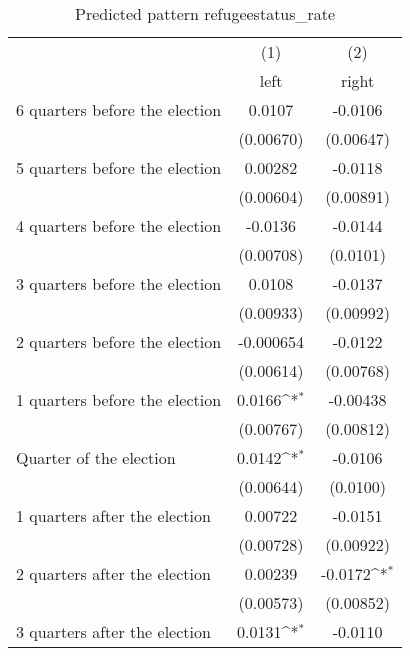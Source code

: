 \begin{table}[htbp]\centering
\def\sym#1{\ifmmode^{#1}\else\(^{#1}\)\fi}
\caption{Predicted pattern refugeestatus\_rate}
\begin{tabular}{l*{2}{c}}
\hline\hline
                    &\multicolumn{1}{c}{(1)}&\multicolumn{1}{c}{(2)}\\
                    &\multicolumn{1}{c}{left}&\multicolumn{1}{c}{right}\\
\hline
 6 quarters before the election&      0.0107         &     -0.0106         \\
                    &   (0.00670)         &   (0.00647)         \\
[1em]
 5 quarters before the election&     0.00282         &     -0.0118         \\
                    &   (0.00604)         &   (0.00891)         \\
[1em]
 4 quarters before the election&     -0.0136         &     -0.0144         \\
                    &   (0.00708)         &    (0.0101)         \\
[1em]
 3 quarters before the election&      0.0108         &     -0.0137         \\
                    &   (0.00933)         &   (0.00992)         \\
[1em]
 2 quarters before the election&   -0.000654         &     -0.0122         \\
                    &   (0.00614)         &   (0.00768)         \\
[1em]
 1 quarters before the election&      0.0166\sym{*}  &    -0.00438         \\
                    &   (0.00767)         &   (0.00812)         \\
[1em]
Quarter of the election&      0.0142\sym{*}  &     -0.0106         \\
                    &   (0.00644)         &    (0.0100)         \\
[1em]
 1 quarters after the election&     0.00722         &     -0.0151         \\
                    &   (0.00728)         &   (0.00922)         \\
[1em]
 2 quarters after the election&     0.00239         &     -0.0172\sym{*}  \\
                    &   (0.00573)         &   (0.00852)         \\
[1em]
 3 quarters after the election&      0.0131\sym{*}  &     -0.0110         \\

\end{tabular}
\end{table}
